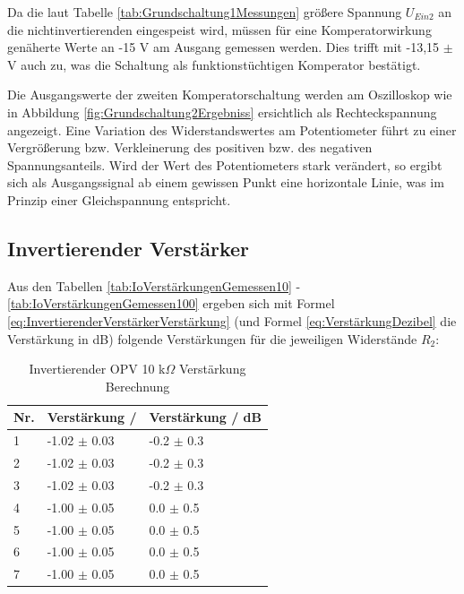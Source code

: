 \documentclass[12pt,a4paper,twoside]{article}
\begin{document}
\noindent
Da die laut Tabelle \ref{tab:Grundschaltung1Messungen} größere Spannung $U_{Ein2}$ an die nichtinvertierenden eingespeist wird, müssen für eine Komperatorwirkung genäherte Werte an -15 V am Ausgang gemessen werden. Dies trifft mit -13,15 $\pm$  V auch zu, was die Schaltung als funktionstüchtigen Komperator bestätigt. \newline

\noindent
Die Ausgangswerte der zweiten Komperatorschaltung werden am Oszilloskop wie in Abbildung \ref{fig:Grundschaltung2Ergebniss} ersichtlich als Rechteckspannung angezeigt. 
Eine Variation des Widerstandswertes am Potentiometer führt zu einer Vergrößerung bzw. Verkleinerung des positiven bzw. des negativen Spannungsanteils. Wird der Wert des Potentiometers stark verändert, so ergibt sich als Ausgangssignal ab einem gewissen Punkt eine horizontale Linie, was im Prinzip einer Gleichspannung entspricht. 


\subsection{Invertierender Verstärker}

Aus den Tabellen \ref{tab:IoVerstärkungenGemessen10} - \ref{tab:IoVerstärkungenGemessen100} ergeben sich mit Formel \ref{eq:InvertierenderVerstärkerVerstärkung} (und Formel \ref{eq:VerstärkungDezibel} die Verstärkung in dB) folgende Verstärkungen für die jeweiligen Widerstände $R_{2}$:

\begin{table}[H]
    \centering
    \caption{Invertierender OPV 10 k$\Omega$ Verstärkung Berechnung}
    \label{tab:IoVerstärkungenBerechnet10}
    \begin{tabular}{| l | l | l |}
        \hline
        Nr. & Verstärkung / & Verstärkung / dB \\
        \hline
        1 & -1.02 $\pm$ 0.03 & -0.2 $\pm$ 0.3 \\
        2 & -1.02 $\pm$ 0.03 & -0.2 $\pm$ 0.3 \\
        3 & -1.02 $\pm$ 0.03 & -0.2 $\pm$ 0.3 \\
        4 & -1.00 $\pm$ 0.05 &  0.0 $\pm$ 0.5 \\
        5 & -1.00 $\pm$ 0.05 &  0.0 $\pm$ 0.5 \\
        6 & -1.00 $\pm$ 0.05 &  0.0 $\pm$ 0.5 \\
        7 & -1.00 $\pm$ 0.05 &  0.0 $\pm$ 0.5 \\
        \hline
    \end{tabular}
\end{table}
\end{document}

